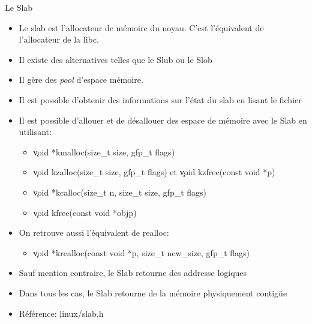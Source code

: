 \begin{frame}[fragile=singleslide]{Le Slab}
  \begin{itemize} 
  \item  Le   slab  est  l'allocateur  de  mémoire   du  noyau.  C'est
    l'équivalent de l'allocateur de la libc.
  \item Il existe des alternatives telles que le Slub ou le Slob
  \item Il gère des \emph{pool} d'espace mémoire. 
  \item Il est possible d'obtenir  des informations sur l'état du slab
    en lisant le fichier 
  \item  Il est  possible d'allouer  et  de désallouer  des espace  de
    mémoire avec le Slab en utilisant:
    \begin{itemize} 
    \item \c{void *kmalloc(size_t size, gfp_t flags)}
    \item \c{void kzalloc(size_t size, gfp_t flags)} et \c{void kzfree(const void *p)}
    \item \c{void *kcalloc(size_t n, size_t size, gfp_t flags)}
    \item \c{void kfree(const void *objp)}
    \end{itemize} 
  \item On retrouve aussi l'équivalent de \c{realloc}:
    \begin{itemize} 
    \item \c{void *krealloc(const void *p, size_t new_size, gfp_t flags)}
    \end{itemize} 
  \item Sauf mention contraire, le Slab retourne des addresse logiques
  \item Dans tous les cas, le Slab retourne de la mémoire physiquement
    contigüe
  \item Référence: \c{linux/slab.h}
  \end{itemize} 
\end{frame} 

